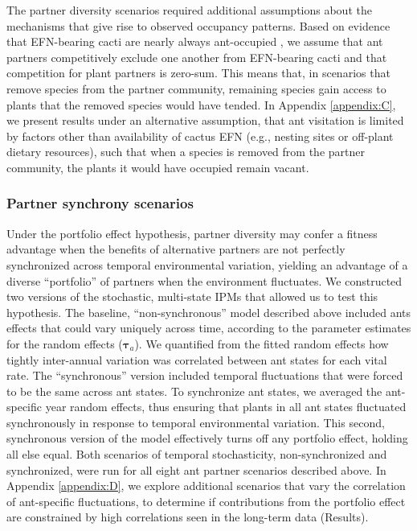 \documentclass[11pt]{article}
\begin{document}
The partner diversity scenarios required additional assumptions about the mechanisms that give rise to observed occupancy patterns. 
Based on evidence that EFN-bearing cacti are nearly always ant-occupied \citep{Miller2014}, we assume that ant partners competitively exclude one another from EFN-bearing cacti and that competition for plant partners is zero-sum. 
This means that, in scenarios that remove species from the partner community, remaining species gain access to plants that the removed species would have tended. 
In Appendix \ref{appendix:C}, we present results under an alternative assumption, that ant visitation is limited by factors other than availability of cactus EFN (e.g., nesting sites or off-plant dietary resources), such that when a species is removed from the partner community, the plants it would have occupied remain vacant. 

\subsubsection*{Partner synchrony scenarios}
Under the portfolio effect hypothesis, partner diversity may confer a fitness advantage when the benefits of alternative partners are not perfectly synchronized across temporal environmental variation, yielding an advantage of a diverse ``portfolio'' of partners when the environment fluctuates. 
We constructed two versions of the stochastic, multi-state IPMs that allowed us to test this hypothesis.
The baseline, ``non-synchronous'' model described above included ants effects that could vary uniquely across time, according to the parameter estimates for the random effects ($\pmb{\tau}_{a}$). 
We quantified from the fitted random effects how tightly inter-annual variation was correlated between ant states for each vital rate.
The ``synchronous'' version included temporal fluctuations that were forced to be the same across ant states. 
To synchronize ant states, we averaged the ant-specific year random effects, thus ensuring that plants in all ant states fluctuated synchronously in response to temporal environmental variation. 
This second, synchronous version of the model effectively turns off any portfolio effect, holding all else equal. 
Both scenarios of temporal stochasticity, non-synchronized and synchronized, were run for all eight ant partner scenarios described above. 
In Appendix \ref{appendix:D}, we explore additional scenarios that vary the correlation of ant-specific fluctuations, to determine if contributions from the portfolio effect are constrained by high correlations seen in the long-term data (Results).
\end{document}
